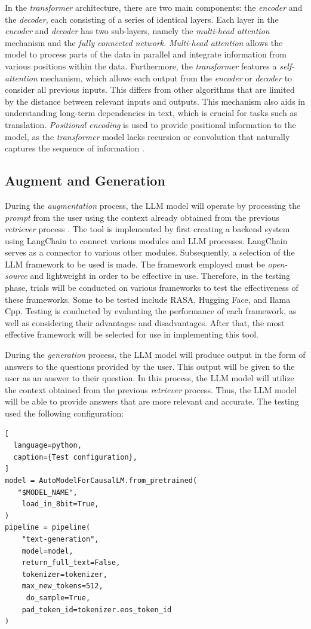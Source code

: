 In the \emph{transformer} architecture, there are two main components: the \emph{encoder} and the \emph{decoder}, each consisting of a series of identical layers. Each layer in the \emph{encoder} and \emph{decoder} has two sub-layers, namely the \emph{multi-head attention} mechanism and the \emph{fully connected network}. \emph{Multi-head attention} allows the model to process parts of the data in parallel and integrate information from various positions within the data. Furthermore, the \emph{transformer} features a \emph{self-attention} mechanism, which allows each output from the \emph{encoder} or \emph{decoder} to consider all previous inputs. This differs from other algorithms that are limited by the distance between relevant inputs and outputs. This mechanism also aids in understanding long-term dependencies in text, which is crucial for tasks such as translation. \emph{Positional encoding} is used to provide positional information to the model, as the \emph{transformer} model lacks recursion or convolution that naturally captures the sequence of information \cite{vaswani2017attention}.
 

\subsection{Augment and Generation}
\label{subsec:AugmentGeneration}

During the \emph{augmentation} process, the LLM model will operate by processing the \emph{prompt} from the user using the context already obtained from the previous \emph{retriever} process \cite{bansal2024llm}. The tool is implemented by first creating a backend system using LangChain to connect various modules and LLM processes. LangChain serves as a connector to various other modules. Subsequently, a selection of the LLM framework to be used is made. The framework employed must be \emph{open-source} and lightweight in order to be effective in use. Therefore, in the testing phase, trials will be conducted on various frameworks to test the effectiveness of these frameworks. Some to be tested include RASA, Hugging Face, and Ilama Cpp. Testing is conducted by evaluating the performance of each framework, as well as considering their advantages and disadvantages. After that, the most effective framework will be selected for use in implementing this tool.

During the \emph{generation} process, the LLM model will produce output in the form of answers to the questions provided by the user. This output will be given to the user as an answer to their question. In this process, the LLM model will utilize the context obtained from the previous \emph{retriever} process. Thus, the LLM model will be able to provide answers that are more relevant and accurate. The testing used the following configuration:
\begin{lstlisting}[
  language=python,
  caption={Test configuration},
]
model = AutoModelForCausalLM.from_pretrained(
   "$MODEL_NAME",
    load_in_8bit=True,
)
pipeline = pipeline(
    "text-generation",
    model=model,
    return_full_text=False,
    tokenizer=tokenizer,
    max_new_tokens=512,
     do_sample=True,
    pad_token_id=tokenizer.eos_token_id
)
\end{lstlisting}


